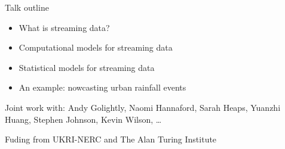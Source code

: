 \begin{frame}{Talk outline}
\protect\hypertarget{talk-outline}{}

\begin{itemize}
\tightlist
\item
  What is streaming data?
\item
  Computational models for streaming data
\item
  Statistical models for streaming data
\item
  An example: nowcasting urban rainfall events
\end{itemize}
\bigskip

Joint work with: Andy Golightly, Naomi Hannaford, Sarah Heaps, Yuanzhi Huang, Stephen Johnson, Kevin Wilson, \ldots

\bigskip

Fuding from UKRI-NERC and The Alan Turing Institute

\end{frame}

